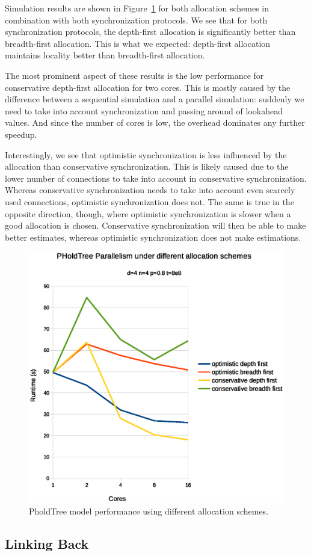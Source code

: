 Simulation results are shown in Figure~\ref{fig:PholdTree_plot_alloc_high} for both allocation schemes in combination with both synchronization protocols.
We see that for both synchronization protocols, the depth-first allocation is significantly better than breadth-first allocation.
This is what we expected: depth-first allocation maintains locality better than breadth-first allocation.

The most prominent aspect of these results is the low performance for conservative depth-first allocation for two cores.
This is mostly caused by the difference between a sequential simulation and a parallel simulation: suddenly we need to take into account synchronization and passing around of lookahead values.
And since the number of cores is low, the overhead dominates any further speedup.

Interestingly, we see that optimistic synchronization is less influenced by the allocation than conservative synchronization.
This is likely caused due to the lower number of connections to take into account in conservative synchronization.
Whereas conservative synchronization needs to take into account even scarcely used connections, optimistic synchronization does not.
The same is true in the opposite direction, though, where optimistic synchronization is slower when a good allocation is chosen.
Conservative synchronization will then be able to make better estimates, whereas optimistic synchronization does not make estimations.

\begin{figure}
    \center
    \includegraphics[width=\modelfraction\columnwidth]{fig/pholdtreeallochighp.eps}
    \caption{PholdTree model performance using different allocation schemes.}
    \label{fig:PholdTree_plot_alloc_high}
\end{figure}

\subsection{Linking Back}


